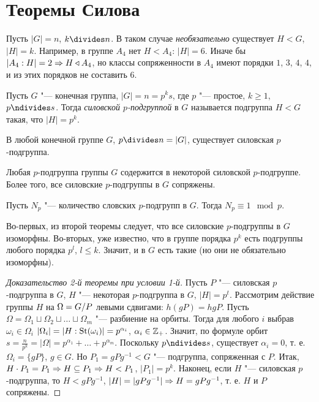 \documentclass[main]{subfiles}
\begin{document}
\section{Теоремы Силова}

Пусть $|G| = n$, $k \divides n$. В таком случае
\emph{необязательно} существует $H < G$,
$|H| = k$.
Например, в группе $A_4$ нет
$H < A_4$: $|H| = 6$.
Иначе бы $|A_4 : H| = 2
\Rightarrow H \triangleleft A_4$,
но классы сопряженности в $A_4$
имеют порядки $1$, \( 3 \), \( 4 \), \( 4 \),
и из этих порядков
не составить $6$.

\begin{definition}
  Пусть $G$ "--- конечная группа, $|G| = n = p^k s$,
  где $p$ "--- простое, $k \ge 1$, $p \ndivides s$.
  Тогда \emph{силовской $p$-подгруппой} в $G$
  называется подгруппа $H < G$ такая,
  что $|H| = p^k$.
\end{definition}

\begin{theorem}
  В любой конечной группе $G$, $p \divides n = |G|$,
  существует силовская $p$-подгруппа.
\end{theorem}
\begin{theorem}
  Любая $p$-подгруппа группы $G$ содержится в
  некоторой силовской $p$-подгруппе.
  Более того, все силовские $p$-подгруппы в $G$
  сопряжены.
\end{theorem}
\begin{theorem}
  Пусть $N_p$ "--- количество словских $p$-подгрупп
  в $G$. Тогда $N_p \equiv 1 \mod{p}$.
\end{theorem}

\begin{remark}
  Во-первых, из второй теоремы следует,
  что все силовские $p$-подгруппы в $G$ изоморфны.
  Во-вторых, уже известно,
  что в группе порядка $p^k$ есть подгруппы любого
  порядка $p^l$, $l \le k$. Значит, и в $G$ есть
  такие (но они не обязательно изоморфны).
\end{remark}

\begin{proof}[Доказательство 2-й теоремы при условии 1-й]
  Пусть $P$ "--- силовская $p$-подгруппа в $G$,
  $H$ "--- некоторая $p$-подгруппа в $G$, $|H| = p^t$.
  Рассмотрим действие группы $H$ на $\Omega = \Factor{G}[P]$
  левыми сдвигами: $h(gP) = hgP$.
  Пусть $\Omega = \Omega_1 \sqcup \Omega_2 \sqcup \dots \sqcup \Omega_m$ "---
  разбиение на орбиты. Тогда для любого $i$ выбрав $\omega_i \in \Omega_i$
  $|\Omega_i| = |H : \operatorname{St}(\omega_i)| = p^{\alpha_i}$, $\alpha_i \in \mathbb{Z}_+$.
  Значит, по формуле орбит
  $s = \frac{n}{p^k} = |\Omega| = p^{\alpha_1} + \dots + p^{\alpha_m}$.
  Поскольку $p \ndivides s$, существует $\alpha_i = 0$,
  т. е. $\Omega_i = \{ gP \}$, $g \in G$.
  Но $P_1 = gP g^{-1} < G$ "--- подгруппа, сопряженная с $P$.
  Итак, $H \cdot P_1 = P_1 \Rightarrow H \subseteq P_1 \Rightarrow H < P_1$, $|P_1| = p^k$.
  Наконец, если $H$ "--- силовская $p$-подгруппа, то $H < g P g^{-1}$,
  $|H| = |gPg^{-1}| \Rightarrow H = gP g^{-1}$, т. е. $H$ и $P$ сопряжены.
\end{proof}
\end{document}
